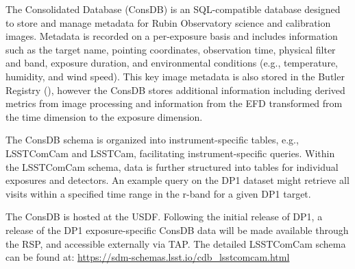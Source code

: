The Consolidated Database (ConsDB) \citep{dmtn-227} is an SQL-compatible database designed to store and manage metadata for Rubin Observatory science and calibration images.
Metadata is recorded on a per-exposure basis and includes information such as the target name, pointing coordinates, observation time, physical filter and band, exposure duration, and environmental conditions (e.g., temperature, humidity, and wind speed).
This key image metadata is also stored in the Butler Registry (), however the ConsDB stores additional information  including derived metrics from image processing and information from the \gls{EFD} transformed from the time dimension to the exposure dimension.

The ConsDB schema is organized into instrument-specific tables, e.g., \gls{LSSTComCam} and LSSTCam, facilitating instrument-specific queries.
Within the \gls{LSSTComCam} schema, data is further structured into tables for individual exposures and detectors.
An example query on the \gls{DP1} dataset might retrieve all visits within a specified time range in the r-band for a given \gls{DP1} target.

The ConsDB is hosted at the \gls{USDF}.
Following the initial release of DP1, a release of the DP1 exposure-specific ConsDB data will be made available through the \gls{RSP}, and accessible externally via TAP.
The detailed \gls{LSSTComCam} schema can be found at:
\url{https://sdm-schemas.lsst.io/cdb_lsstcomcam.html}
